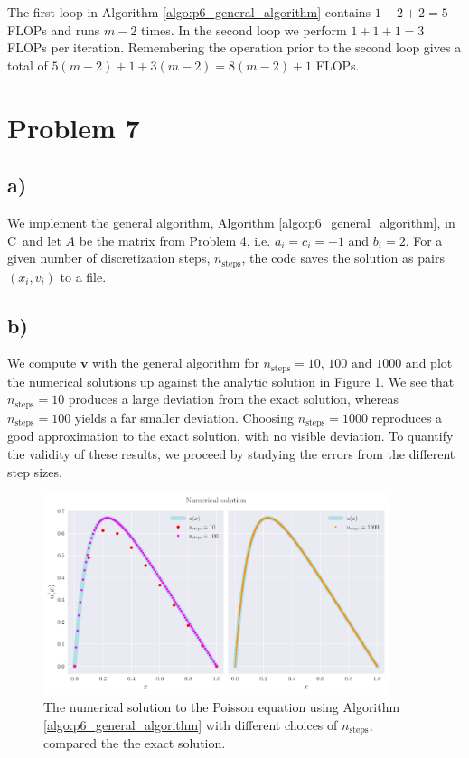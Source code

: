 \documentclass[english,notitlepage,nofootinbib]{revtex4-1}  %
\newcommand{\Fig}[1]{Figure \ref{fig:#1}}
\newcommand{\Algo}[1]{Algorithm \ref{algo:#1}}
\newcommand{\CC}{C\nolinebreak\hspace{-.05em}\raisebox{.4ex}{\tiny\bf +}\nolinebreak\hspace{-.10em}\raisebox{.4ex}{\tiny\bf +}}
\begin{document}
The first loop in \Algo{p6_general_algorithm} contains $1+2+2=5$ FLOPs and runs $m-2$ times. In the second loop we perform $1+1+1=3$ FLOPs per iteration. Remembering the operation prior to the second loop gives a total of $5(m-2)+1+3(m-2)=8(m-2)+1$ FLOPs.


\section*{Problem 7}

\subsection*{a)}

We implement the general algorithm, \Algo{p6_general_algorithm}, in \CC\, and let $A$ be the matrix from Problem 4, i.e. $a_i=c_i=-1$ and $b_i=2$. For a given number of discretization steps, $n_\text{steps}$, the code saves the solution as pairs $(x_i, v_i)$ to a file.


\subsection*{b)}

We compute $\mathbf{v}$ with the general algorithm for $n_\text{steps}=10,\, 100 \text{ and } 1000$ and plot the numerical solutions up against the analytic solution in \Fig{p7_num_sol}. We see that $n_\text{steps}=10$ produces a large deviation from the exact solution, whereas $n_\text{steps}=100$ yields a far smaller deviation. Choosing $n_\text{steps}=1000$ reproduces a good approximation to the exact solution, with no visible deviation. To quantify the validity of these results, we proceed by studying the errors from the different step sizes.

\begin{figure}[h!]
    \centering
    \includegraphics[width=0.9\textwidth]{comparison_p7.pdf}
    \caption{The numerical solution to the Poisson equation using \Algo{p6_general_algorithm} with different choices of $n_\text{steps}$, compared the the exact solution.}\label{fig:p7_num_sol}
\end{figure}
\end{document}
